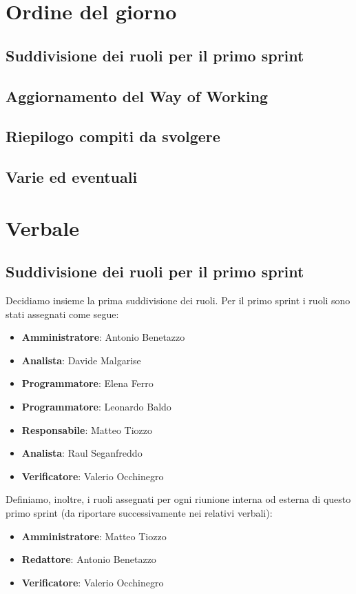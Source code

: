 \documentclass[italian,12pt]{article}
\begin{document}
\section{Ordine del giorno}
\subsection{Suddivisione dei ruoli per il primo sprint}
\subsection{Aggiornamento del Way of Working}
\subsection{Riepilogo compiti da svolgere}
\subsection{Varie ed eventuali}

\newpage

\section{Verbale}

\subsection{Suddivisione dei ruoli per il primo sprint}
Decidiamo insieme la prima suddivisione dei ruoli. Per il primo sprint i ruoli sono stati assegnati come segue:
\begin{itemize}
	\item \textbf{Amministratore}: Antonio Benetazzo
	\item \textbf{Analista}: Davide Malgarise
	\item \textbf{Programmatore}: Elena Ferro
	\item \textbf{Programmatore}: Leonardo Baldo
	\item \textbf{Responsabile}: Matteo Tiozzo
	\item \textbf{Analista}: Raul Seganfreddo
	\item \textbf{Verificatore}: Valerio Occhinegro
\end{itemize}
Definiamo, inoltre, i ruoli assegnati per ogni riunione interna od esterna 
di questo primo sprint (da riportare successivamente nei relativi verbali):
\begin{itemize}
	\item \textbf{Amministratore}: Matteo Tiozzo
	\item \textbf{Redattore}: Antonio Benetazzo
	\item \textbf{Verificatore}: Valerio Occhinegro
\end{itemize}
\end{document}

